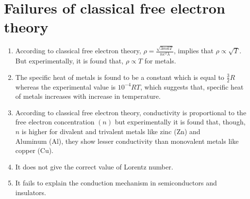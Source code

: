 \documentclass[15pt]{article}
\begin{document}
\section*{Failures of classical free electron theory}
\begin{enumerate}
    \item According to classical free electron theory, $\rho = \frac{\sqrt{3mkT}}{ne^{2}\lambda}$, implies that $\rho \propto \sqrt{T}$. But experimentally, it is found that, $\rho \propto T$ for metals.
    \item The specific heat of metals is found to be a constant which is equal to $\frac{3}{2}R$ whereas the experimental value is $10^{-4}RT$, which suggests that, specific heat of metals increases with increase in temperature.
    \item According to classical free electron theory, conductivity is proportional to the free electron concentration $(n)$ but experimentally it is found that, though, $n$ is higher for divalent and trivalent metals like zinc (Zn) and \\ Aluminum (Al), they show lesser conductivity than monovalent metals like copper (Cu).
    \item It does not give the correct value of Lorentz number.
    \item It fails to explain the conduction mechanism in semiconductors and \\ insulators.
\end{enumerate}
\end{document}
